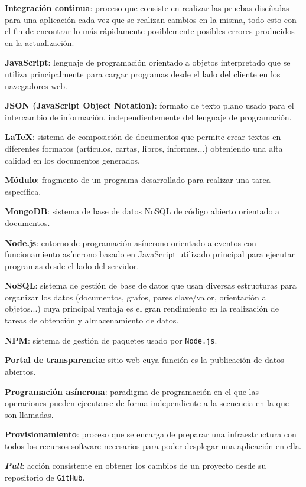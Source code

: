\textbf{Integración continua}: proceso que consiste en realizar las pruebas diseñadas para una aplicación cada vez que se realizan cambios en la misma, todo esto con el fin de encontrar lo más rápidamente posiblemente posibles errores producidos en la actualización.
\bigskip

\textbf{JavaScript}: lenguaje de programación orientado a objetos interpretado que se utiliza principalmente para cargar programas desde el lado del cliente en los navegadores web.
\bigskip

\textbf{JSON (JavaScript Object Notation)}: formato de texto plano usado para el intercambio de información, independientemente del lenguaje de programación.
\bigskip

\textbf{LaTeX}: sistema de composición de documentos que permite crear textos en diferentes formatos (artículos, cartas, libros, informes...) obteniendo una alta calidad en los documentos generados.
\bigskip

\textbf{Módulo}: fragmento de un programa desarrollado para realizar una tarea específica.
\bigskip

\textbf{MongoDB}: sistema de base de datos NoSQL de código abierto orientado a documentos.
\bigskip

\textbf{Node.js}: entorno de programación asíncrono orientado a eventos con funcionamiento asíncrono basado en JavaScript utilizado principal para ejecutar programas desde el lado del servidor.
\bigskip

\textbf{NoSQL}: sistema de gestión de base de datos que usan diversas estructuras para organizar los datos (documentos, grafos, pares clave/valor, orientación a objetos...) cuya principal ventaja es el gran rendimiento en la realización de tareas de obtención y almacenamiento de datos.
\bigskip

\textbf{NPM}: sistema de gestión de paquetes usado por {\tt Node.js}.
\bigskip

\textbf{Portal de transparencia}: sitio web cuya función es la publicación de datos abiertos.
\bigskip

\textbf{Programación asíncrona}: paradigma de programación en el que las operaciones pueden ejecutarse de forma independiente a la secuencia en la que son llamadas.
\bigskip

\textbf{Provisionamiento}: proceso que se encarga de preparar una infraestructura con todos los recursos software necesarios para poder desplegar una aplicación en ella.
\bigskip

\textbf{\textit{Pull}}: acción consistente en obtener los cambios de un proyecto desde su repositorio de {\tt GitHub}.
\bigskip

